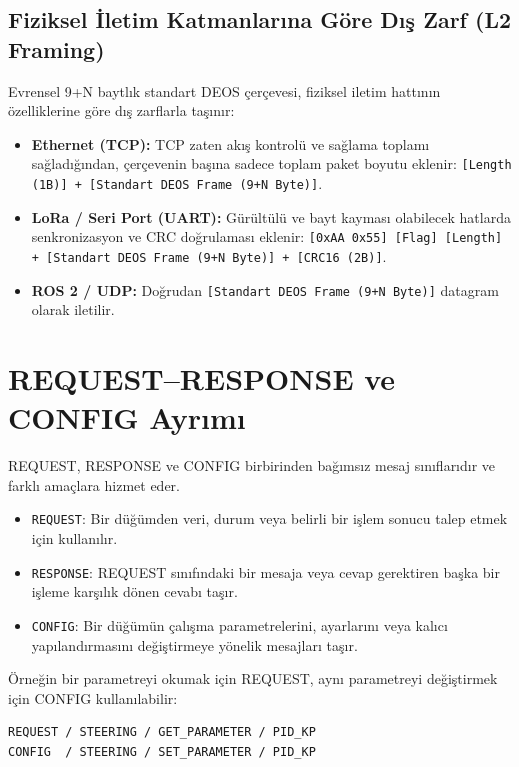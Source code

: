 \documentclass[a4paper,10pt]{article}
\newcommand{\code}[1]{\texttt{#1}}
\begin{document}
\subsection{Fiziksel İletim Katmanlarına Göre Dış Zarf (L2 Framing)}

Evrensel 9+N baytlık standart DEOS çerçevesi, fiziksel iletim hattının özelliklerine göre dış zarflarla taşınır:
\begin{itemize}
    \item \textbf{Ethernet (TCP):} TCP zaten akış kontrolü ve sağlama toplamı sağladığından, çerçevenin başına sadece toplam paket boyutu eklenir: \code{[Length (1B)] + [Standart DEOS Frame (9+N Byte)]}.
    \item \textbf{LoRa / Seri Port (UART):} Gürültülü ve bayt kayması olabilecek hatlarda senkronizasyon ve CRC doğrulaması eklenir: \code{[0xAA 0x55] [Flag] [Length] + [Standart DEOS Frame (9+N Byte)] + [CRC16 (2B)]}.
    \item \textbf{ROS 2 / UDP:} Doğrudan \code{[Standart DEOS Frame (9+N Byte)]} datagram olarak iletilir.
\end{itemize}

\section{REQUEST--RESPONSE ve CONFIG Ayrımı}

REQUEST, RESPONSE ve CONFIG birbirinden bağımsız mesaj sınıflarıdır ve farklı amaçlara hizmet eder.

\begin{itemize}
    \item \code{REQUEST}: Bir düğümden veri, durum veya belirli bir işlem sonucu talep etmek için kullanılır.
    \item \code{RESPONSE}: REQUEST sınıfındaki bir mesaja veya cevap gerektiren başka bir işleme karşılık dönen cevabı taşır.
    \item \code{CONFIG}: Bir düğümün çalışma parametrelerini, ayarlarını veya kalıcı yapılandırmasını değiştirmeye yönelik mesajları taşır.
\end{itemize}

Örneğin bir parametreyi okumak için REQUEST, aynı parametreyi değiştirmek için CONFIG
kullanılabilir:

\begin{verbatim}
REQUEST / STEERING / GET_PARAMETER / PID_KP
CONFIG  / STEERING / SET_PARAMETER / PID_KP
\end{verbatim}
\end{document}
